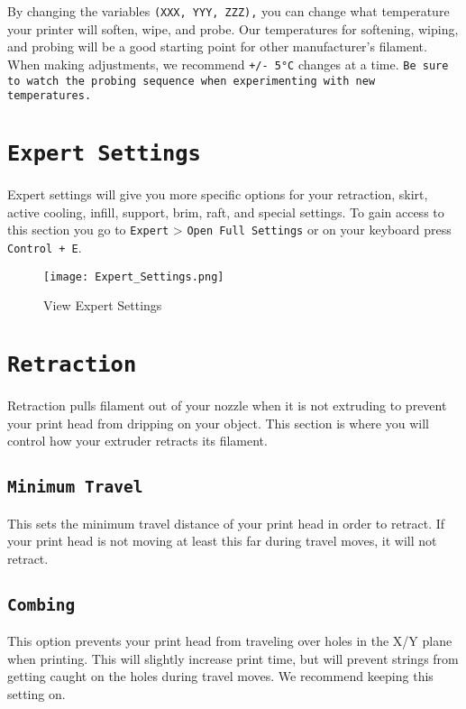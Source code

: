 By changing the variables \texttt{(XXX, YYY, ZZZ),} you can change what temperature your printer will soften, wipe, and probe. Our temperatures for softening, wiping, and probing will be a good starting point for other manufacturer's filament. When making adjustments, we recommend \texttt{+/- 5°C} changes at a time. \texttt{Be sure to watch the probing sequence when experimenting with new temperatures.}

\section{\texttt{Expert Settings}}
Expert settings will give you more specific options for your retraction, skirt, active cooling, infill, support, brim, raft, and special settings. To gain access to this section you go to \texttt{Expert} > \texttt{Open Full Settings} or on your keyboard press \texttt{Control + E}.
\begin{figure}[H]
\centering
\texttt{[image: Expert\_Settings.png]}
\caption{View Expert Settings}
\label{fig:Expert Settings}
\end{figure}

\section{\texttt{Retraction}}
Retraction pulls filament out of your nozzle when it is not extruding to prevent your print head from dripping on your object. This section is where you will control how your extruder retracts its filament.

\subsection{\texttt{Minimum Travel}}
This sets the minimum travel distance of your print head in order to retract. If your print head is not moving at least this far during travel moves, it will not retract.

\subsection{\texttt{Combing}}
This option prevents your print head from traveling over holes in the X/Y plane when printing. This will slightly increase print time, but will prevent strings from getting caught on the holes during travel moves. We recommend keeping this setting on.


